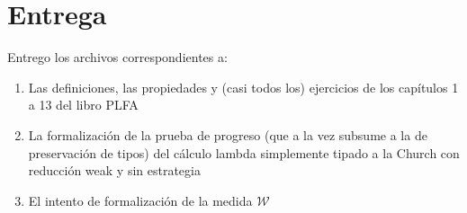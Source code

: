 \documentclass{article}
\begin{document}
\section{Entrega}

Entrego los archivos correspondientes a:

\begin{enumerate}
\item Las definiciones, las propiedades y (casi todos los) ejercicios de los capítulos 1 a 13 del libro PLFA
\item La formalización de la prueba de progreso (que a la vez subsume a la de preservación de tipos) del cálculo lambda simplemente tipado a la Church con reducción weak y sin estrategia
\item El intento de formalización de la medida $\mathcal{W}$
\end{enumerate}
\end{document}
